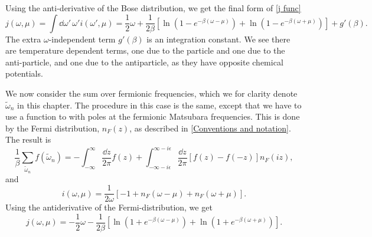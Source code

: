 Using the anti-derivative of the Bose distribution, we get the final form of \autoref{j func}
\begin{equation}
    j(\omega, \mu) = \int \dd \omega'\, \omega' i(\omega', \mu)
    =  
    \frac{1}{2}\omega + \frac{1}{2\beta} 
    \left[
        \ln\left(1 - e^{-\beta(\omega - \mu)}\right)
        + \ln\left(1 - e^{-\beta(\omega + \mu)}\right)
    \right]
    + g'(\beta).
\end{equation}
The extra $\omega$-independent term $g'(\beta)$ is an integration constant.
We see there are temperature dependent terms, one due to the particle and one due to the anti-particle, and one due to the antiparticle, as they have opposite chemical potentials.

We now consider the sum over fermionic frequencies, which we for clarity denote $\tilde \omega_n$ in this chapter.
The procedure in this case is the same, except that we have to use a function to with poles at the fermionic Matsubara frequencies.
This is done by the Fermi distribution, $n_F(z)$, as described in \autoref{Conventions and notation}.
The result is 
\begin{equation}
    \frac{1}{\beta} \sum_{\tilde \omega_n} f(\tilde \omega_n) 
    = 
    -\int_{-\infty}^{\infty} \frac{\dd z}{2 \pi} f(z)
    +
    \int_{-\infty - i \epsilon}^{\infty - i \epsilon}\frac{\dd z}{2 \pi}
    \left[
        f(z) - f(-z)
    \right]
    n_F(iz),
\end{equation}
and 
\begin{equation}
    i(\omega, \mu) = \frac{1}{2 \omega} [-1 + n_F(\omega - \mu) + n_F(\omega + \mu)].
\end{equation}
Using the antiderivative of the Fermi-distribution, we get
\begin{equation}
    j(\omega, \mu) 
    = - \frac{1}{2} \omega 
    - \frac{1}{2 \beta }
    \left[
        \ln\left(1 + e^{-\beta(\omega - \mu)}\right)
        + \ln\left(1 + e^{-\beta(\omega + \mu)}\right)
    \right].
\end{equation}

